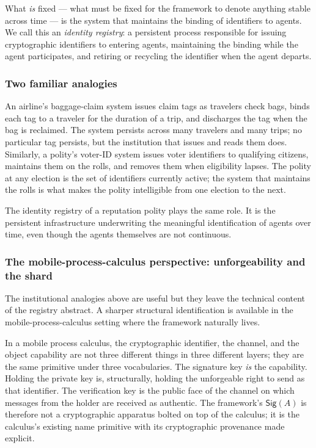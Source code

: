\documentclass[11pt]{article}
\theoremstyle{definition}
\theoremstyle{plain}
\theoremstyle{remark}
\newcommand{\Sig}{\mathsf{Sig}}
\begin{document}
What \emph{is} fixed --- what must be fixed for the framework to denote anything stable across time --- is the system that maintains the binding of identifiers to agents. We call this an \emph{identity registry}: a persistent process responsible for issuing cryptographic identifiers to entering agents, maintaining the binding while the agent participates, and retiring or recycling the identifier when the agent departs.

\subsubsection*{Two familiar analogies}

An airline's baggage-claim system issues claim tags as travelers check bags, binds each tag to a traveler for the duration of a trip, and discharges the tag when the bag is reclaimed. The system persists across many travelers and many trips; no particular tag persists, but the institution that issues and reads them does. Similarly, a polity's voter-ID system issues voter identifiers to qualifying citizens, maintains them on the rolls, and removes them when eligibility lapses. The polity at any election is the set of identifiers currently active; the system that maintains the rolls is what makes the polity intelligible from one election to the next.

The identity registry of a reputation polity plays the same role. It is the persistent infrastructure underwriting the meaningful identification of agents over time, even though the agents themselves are not continuous.

\subsubsection*{The mobile-process-calculus perspective: unforgeability and the shard}

The institutional analogies above are useful but they leave the technical content of the registry abstract. A sharper structural identification is available in the mobile-process-calculus setting where the framework naturally lives.

In a mobile process calculus, the cryptographic identifier, the channel, and the object capability are not three different things in three different layers; they are the same primitive under three vocabularies. The signature key \emph{is} the capability. Holding the private key is, structurally, holding the unforgeable right to send as that identifier. The verification key is the public face of the channel on which messages from the holder are received as authentic. The framework's $\Sig(A)$ is therefore not a cryptographic apparatus bolted on top of the calculus; it is the calculus's existing name primitive with its cryptographic provenance made explicit.
\end{document}
